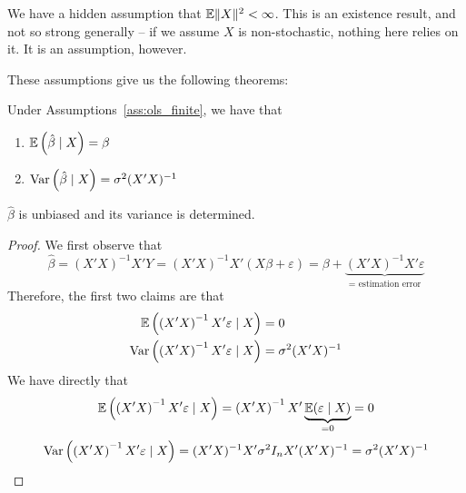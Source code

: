 \documentclass[10pt]{article}
\begin{document}
We have a hidden assumption that $\mathbb{E} \|X\|^2 < \infty$. This is an existence result, and not so strong generally -- if we assume $X$ is non-stochastic, nothing here relies on it. It is an assumption, however.

These assumptions give us the following theorems:

\begin{theorem}
	 Under Assumptions~\ref{ass:ols_finite}, we have that
	\begin{enumerate}
		\item $\mathbb{E}\left(\hat{\beta} \mid X\right) = \beta$
		\item $\mathop{\rm Var}\left( \hat{\beta} \mid X\right) = \sigma^2 (X'X)^{-1}$
	\end{enumerate}
	\ie $\hat{\beta}$ is unbiased and its variance is determined.
\end{theorem}
\begin{proof}
	We first observe that \[ \hat{\beta} = (X'X)^{-1}X'Y = (X'X)^{-1}X'(X\beta + \varepsilon) = \beta + \underbrace{(X'X)^{-1}X'\varepsilon}_{=\text{ estimation error}} \]Therefore, the first two claims are that 
	\begin{align*}
		\mathbb{E}\left( \left( X'X\right)^{-1}X'\varepsilon \mid X\right) &= 0 \\ \mathop{\rm Var}\left( \left( X'X\right)^{-1}X'\varepsilon \mid X\right) &= \sigma^2 (X'X)^{-1}
	\end{align*}
	We have directly that
	\[
	\mathbb{E}\left( \left( X'X\right)^{-1}X'\varepsilon \mid X\right) = \left( X'X\right)^{-1}X'\underbrace{\mathbb{E}(\varepsilon \mid X)}_{=0} = 0
	\]
	\[
	\mathop{\rm Var}\left( \left( X'X\right)^{-1}X'\varepsilon \mid X\right) = (X'X)^{-1} X' \sigma^2I_n X' (X'X)^{-1} = \sigma^2 (X'X)^{-1}
	\]
\end{proof}
\end{document}
